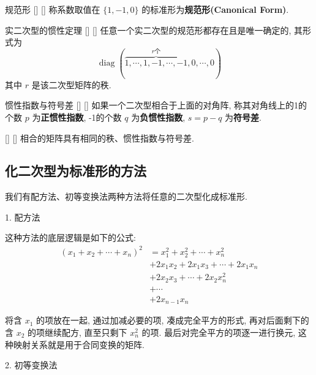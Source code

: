 \documentclass[UTF8]{ctexart}
\DeclareMathOperator{\0}{\mathbf{0}}
\DeclareMathOperator{\<}{\langle}
\renewcommand{\>}{\rangle}
\DeclareMathOperator{\diag}{diag}
\begin{document}
		\begin{dfn}
			[]
			{规范形}
			[]
			[]
			称系数取值在 \(\{1,-1,0\}\) 的标准形为\textbf{规范形(Canonical Form)}.
		\end{dfn}

		\begin{thm}
			[]
			{实二次型的惯性定理}
			[]
			[]
			任意一个实二次型的规范形都存在且是唯一确定的, 其形式为\begin{displaymath}
			    \diag(\overbrace{1,\cdots,1,-1,\cdots,-1}^{r\text{个}},0,\cdots,0)
			\end{displaymath}
			其中 \(r\) 是该二次型矩阵的秩.
		\end{thm}

		\begin{dfn}
			[]
			{惯性指数与符号差}
			[]
			[]
			如果一个二次型相合于上面的对角阵, 称其对角线上的1的个数 \(p\) 为\textbf{正惯性指数}, -1的个数 \(q\) 为\textbf{负惯性指数},  \(s=p-q\) 为\textbf{符号差}. 
		\end{dfn}

		\begin{ppt}
			[]
			{}
			[]
			[]
			相合的矩阵具有相同的秩、惯性指数与符号差. 
		\end{ppt}

	\subsection{化二次型为标准形的方法}

		我们有配方法、初等变换法两种方法将任意的二次型化成标准形. 

			{}
			{1. 配方法}
			{}
			{}

		这种方法的底层逻辑是如下的公式: 
		\begin{equation*}\begin{aligned}
			(x_1+x_2+\cdots+x_n)^2&=x_1^2+x_2^2+\cdots+x_n^2\\
			&+2x_1x_2+2x_1x_3+\cdots+2x_1x_n\\
			&+2x_2x_3+\cdots+2x_2x_n^2\\
			&+\cdots\\
			&+2x_{n-1}x_n
		\end{aligned}
		\end{equation*}
		
		将含 \(x_1\) 的项放在一起, 通过加减必要的项, 凑成完全平方的形式, 再对后面剩下的含 \(x_2\) 的项继续配方, 直至只剩下 \(x_n^2\) 的项. 最后对完全平方的项逐一进行换元, 这种映射关系就是用于合同变换的矩阵. 

			{}
			{2. 初等变换法}
			{}
			{}
\end{document}
